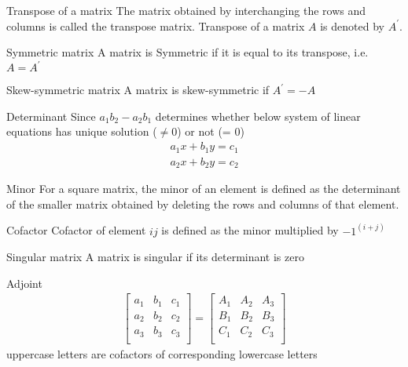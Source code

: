 \documentclass[titlepage, 12pt]{book}
\begin{document}
\begin{definition}{Transpose of a matrix}{}
    The matrix obtained by interchanging the rows and columns is called the
    transpose matrix. Transpose of a matrix $A$ is denoted by $A^\prime$.
\end{definition}

\begin{definition}{Symmetric matrix}{}
    A matrix is Symmetric if it is equal to its transpose, i.e. $A = A^\prime$
\end{definition}

\begin{definition}{Skew-symmetric matrix}{}
    A matrix is skew-symmetric if $A^\prime =-A$
\end{definition}

\begin{definition}{Determinant}{}
    Since $a_1b_2 - a_2b_1$ determines whether below system of linear equations
    has unique solution ($\neq 0$) or not (= 0)
    \begin{align*}
        a_1x+b_1y = c_1\\
        a_2x+b_2y = c_2
    \end{align*}
\end{definition}

\begin{definition}{Minor}{}
    For a square matrix, the minor of an element is defined as the determinant
    of the smaller matrix obtained by deleting the rows and columns of that
    element.
\end{definition}

\begin{definition}{Cofactor}{}
    Cofactor of element $ij$ is defined as the minor multiplied by $-1^{(i +
    j)}$
\end{definition}

\begin{definition}{Singular matrix}{}
    A matrix is singular if its determinant is zero
\end{definition}

\begin{definition}{Adjoint}{}
    \begin{align*}
        \begin{bmatrix}
            a_1 & b_1 & c_1\\
            a_2 & b_2 & c_2\\
            a_3 & b_3 & c_3\\
        \end{bmatrix}
        = 
        \begin{bmatrix}
            A_1 & A_2 & A_3\\
            B_1 & B_2 & B_3\\
            C_1 & C_2 & C_3\\
        \end{bmatrix}
    \end{align*}
    uppercase letters are cofactors of corresponding lowercase letters
\end{definition}
\end{document}
